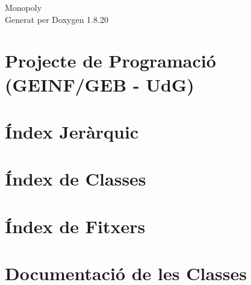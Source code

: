 \let\mypdfximage\pdfximage\def\pdfximage{\immediate\mypdfximage}\documentclass[twoside]{book}
\newcommand{\+}{\discretionary{\mbox{\scriptsize$\hookleftarrow$}}{}{}}
\newcommand{\clearemptydoublepage}{%
  \newpage{\pagestyle{empty}\cleardoublepage}%
}
\begin{document}
\hypersetup{pageanchor=false,
             bookmarksnumbered=true,
             pdfencoding=unicode
            }
\begin{titlepage}
\vspace*{7cm}
\begin{center}%
{\Large Monopoly }\\
\vspace*{1cm}
{\large Generat per Doxygen 1.8.20}\\
\end{center}
\end{titlepage}
\clearemptydoublepage
{}
\tableofcontents
\clearemptydoublepage
{}
\hypersetup{pageanchor=true}

\chapter{Projecte de Programació (G\+E\+I\+N\+F/\+G\+EB -\/ UdG)}
\label{md__d___u_d_g21__p_p_r_o__p_r_o_j_e_c_t_e_projecte-a9_src__r_e_a_d_m_e}

\chapter{Índex Jeràrquic}

\chapter{Índex de Classes}

\chapter{Índex de Fitxers}

\chapter{Documentació de les Classes}





























\end{document}
